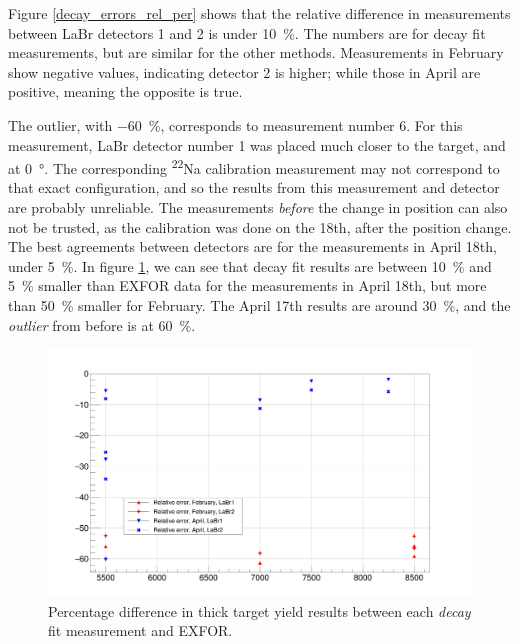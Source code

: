\documentclass[a4paper,12pt]{report}
\begin{document}
Figure \ref{decay_errors_rel_per} shows that the relative difference in measurements between LaBr detectors 1 and 2 is under \qty{10}{\percent}.
The numbers are for decay fit measurements, but are similar for the other methods.
Measurements in February show negative values, indicating detector 2 is higher; while those in April are positive, meaning the opposite is true.

The outlier, with \qty{-60}{\percent}, corresponds to measurement number 6.
For this measurement, LaBr detector number 1 was placed much closer to the target, and at \qty{0}{\degree}.
The corresponding \textsuperscript{22}Na calibration measurement may not correspond to that exact configuration, and so the results from this measurement and detector are probably unreliable.
The measurements \emph{before} the change in position can also not be trusted, as the calibration was done on the 18th, after the position change.
\\

The best agreements between detectors are for the measurements in April 18th, under \qty{5}{\percent}.
In figure \ref{decay_errors_per}, we can see that decay fit results are between \qty{10}{\percent} and \qty{5}{\percent} smaller than EXFOR data for the measurements in April 18th, but more than \qty{50}{\percent} smaller for February.
The April 17th results are around \qty{30}{\percent}, and the \textit{outlier} from before is at \qty{60}{\percent}.

\begin{figure}[H]
	\centering
	\includegraphics[width=\textwidth]{decay_errors_per.png}
	\caption{Percentage difference in thick target yield results between each \textit{decay} fit measurement and EXFOR.}
	\label{decay_errors_per}
\end{figure}
\end{document}
